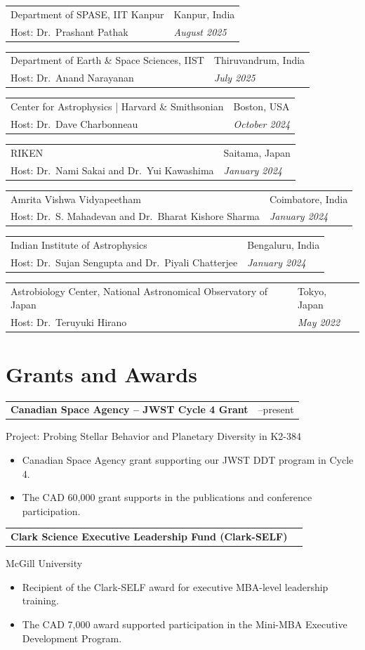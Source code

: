 \documentclass[10pt,a4paper]{article}
\makeatletter
\newcommand{\invitedtalkentry}[4]{%
\begin{tabularx}{\textwidth}{
    @{}
    >{\raggedright\arraybackslash}X
    >{\raggedleft\arraybackslash}p{4.5cm}
    @{}
}
#1 & #2 \\
\textcolor{entrylight}{Host: #3} &
\textcolor{entrylight}{\emph{#4}}
\end{tabularx}
\vspace{2pt}
}
\newcommand{\grantheading}[2]{%
\begin{tabularx}{\textwidth}{
    @{}
    >{\raggedright\arraybackslash}X
    >{\raggedleft\arraybackslash}p{4.5cm}
    @{}
}
\textbf{#1} & #2
\end{tabularx}
}
\newenvironment{lightitems}
{%
  \begin{itemize}[
      label=\textcolor{entrylight}{\textbullet},
      leftmargin=1.3em,
      itemsep=1pt,
      topsep=2pt,
      parsep=0pt
  ]
  \color{entrylight}
}
{%
  \end{itemize}
}
\makeatother
\begin{document}
\invitedtalkentry
{Department of SPASE, IIT Kanpur}
{Kanpur, India}
{Dr.\ Prashant Pathak}
{August 2025}

\invitedtalkentry
{Department of Earth \& Space Sciences, IIST}
{Thiruvandrum, India}
{Dr.\ Anand Narayanan}
{July 2025}

\invitedtalkentry
{Center for Astrophysics | Harvard \& Smithsonian}
{Boston, USA}
{Dr.\ Dave Charbonneau}
{October 2024}

\invitedtalkentry
{RIKEN}
{Saitama, Japan}
{Dr.\ Nami Sakai and Dr.\ Yui Kawashima}
{January 2024}

\invitedtalkentry
{Amrita Vishwa Vidyapeetham}
{Coimbatore, India}
{Dr.\ S. Mahadevan and Dr.\ Bharat Kishore Sharma}
{January 2024}

\invitedtalkentry
{Indian Institute of Astrophysics}
{Bengaluru, India}
{Dr.\ Sujan Sengupta and Dr.\ Piyali Chatterjee}
{January 2024}

\invitedtalkentry
{Astrobiology Center, National Astronomical Observatory of Japan}
{Tokyo, Japan}
{Dr.\ Teruyuki Hirano}
{May 2022}

\section{Grants and Awards}

\grantheading
{Canadian Space Agency -- JWST Cycle 4 Grant}
{2025--present}
Project: Probing Stellar Behavior and Planetary Diversity in K2-384 \vspace{-1.5mm}
\begin{lightitems}
\item
Canadian Space Agency grant supporting our JWST DDT program in Cycle 4.
\item
The CAD 60,000 grant supports in the publications and conference participation.
\end{lightitems}


\grantheading
{Clark Science Executive Leadership Fund (Clark-SELF)}
{2025}
McGill University \vspace{-1.5mm}
\begin{lightitems}
\item
Recipient of the Clark-SELF award for executive MBA-level leadership
training.
\item
The CAD 7,000 award supported participation in the Mini-MBA Executive
Development Program.
\end{lightitems}
\end{document}
